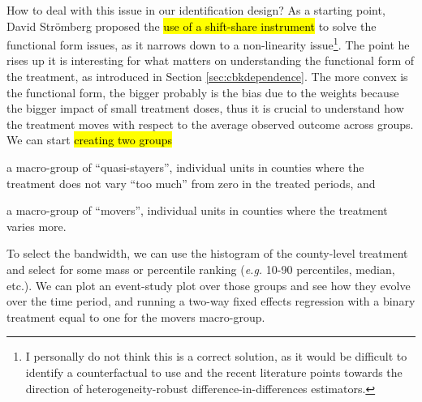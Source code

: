\documentclass[11pt]{article}
\begin{document}
How to deal with this issue in our identification design? As a starting point, David Str\"{o}mberg proposed the \hl{use of a shift-share instrument} \citep{bib:goldsmith-pinkham2020} to solve the functional form issues, as it narrows down to a non-linearity issue\footnote{I personally do not think this is a correct solution, as it would be difficult to identify a counterfactual to use and the recent literature points towards the direction of heterogeneity-robust difference-in-differences estimators.}. The point he rises up it is interesting for what matters on understanding the functional form of the treatment, as introduced in Section \ref{sec:cbkdependence}. The more convex is the functional form, the bigger probably is the bias due to the weights because the bigger impact of small treatment doses, thus it is crucial to understand how the treatment moves with respect to the average observed outcome across groups. We can start \hl{creating two groups}
\begin{inlinelist}
    \item a macro-group of ``quasi-stayers'', individual units in counties where the treatment does not vary ``too much'' from zero in the treated periods, and
    \item a macro-group of ``movers'', individual units in counties where the treatment varies more. 
\end{inlinelist}
To select the bandwidth, we can use the histogram of the county-level treatment and select for some mass or percentile ranking (\textit{e.g.} 10-90 percentiles, median, etc.). We can plot an event-study plot over those groups and see how they evolve over the time period, and running a two-way fixed effects regression with a binary treatment equal to one for the movers macro-group.
\end{document}
